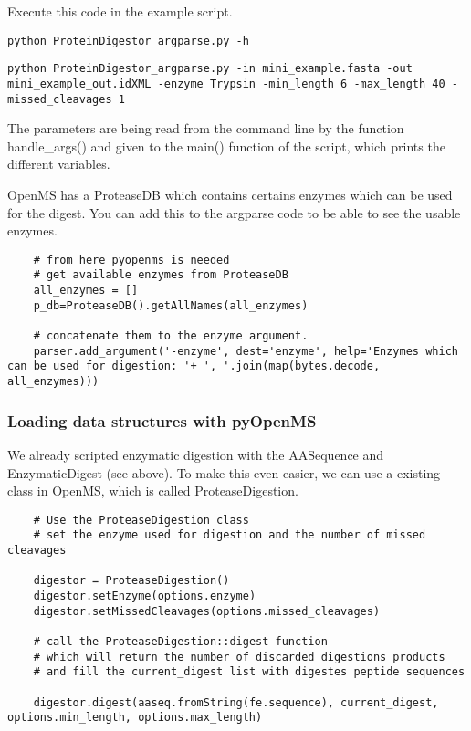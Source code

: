 {\noindent Execute this code in the example script.
\begin{lstlisting}
python ProteinDigestor_argparse.py -h
\end{lstlisting}

\begin{lstlisting}
python ProteinDigestor_argparse.py -in mini_example.fasta -out mini_example_out.idXML -enzyme Trypsin -min_length 6 -max_length 40 -missed_cleavages 1
\end{lstlisting}

\noindent The parameters are being read from the command line by the function handle\_args() and given to the main() function of the script, which prints the different variables.

\noindent OpenMS has a ProteaseDB which contains certains enzymes which can be used for the digest. You can add this to the argparse code to be able to see the usable enzymes. 
\begin{lstlisting}
    # from here pyopenms is needed
    # get available enzymes from ProteaseDB
    all_enzymes = []
    p_db=ProteaseDB().getAllNames(all_enzymes)
    
    # concatenate them to the enzyme argument.
    parser.add_argument('-enzyme', dest='enzyme', help='Enzymes which can be used for digestion: '+ ', '.join(map(bytes.decode, all_enzymes)))
\end{lstlisting}

\subsubsection{Loading data structures with pyOpenMS}
We already scripted enzymatic digestion with the AASequence and EnzymaticDigest (see above). To make this even easier, we can use a existing class in OpenMS, which is called ProteaseDigestion.

\begin{lstlisting}
    # Use the ProteaseDigestion class
    # set the enzyme used for digestion and the number of missed cleavages
    
    digestor = ProteaseDigestion()
    digestor.setEnzyme(options.enzyme)
    digestor.setMissedCleavages(options.missed_cleavages)
    
    # call the ProteaseDigestion::digest function
    # which will return the number of discarded digestions products  
    # and fill the current_digest list with digestes peptide sequences
    
    digestor.digest(aaseq.fromString(fe.sequence), current_digest, options.min_length, options.max_length)
\end{lstlisting}

}
